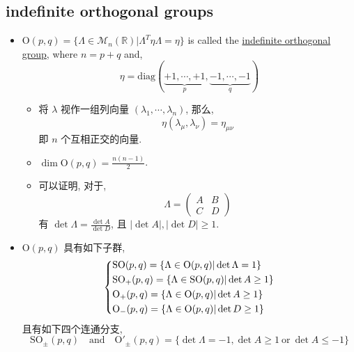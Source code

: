 \subsection{indefinite orthogonal groups}
\begin{itemize}
	\item $\mathrm{O}(p, q) = \{\Lambda \in \mathcal{M}_n(\mathbb{R}) | \Lambda^T \eta \Lambda = \eta\}$ is called the \href{https://en.wikipedia.org/wiki/Indefinite_orthogonal_group}{indefinite orthogonal group}, where $n = p + q$ and,
	\begin{equation}
		\eta = \mathrm{diag}(\underbrace{+ 1, \cdots, + 1}_{p}, \underbrace{- 1, \cdots, - 1}_{q})
	\end{equation}
	\begin{itemize}
		\item 将 $\lambda$ 视作一组列向量 $(\lambda_1, \cdots, \lambda_n)$, 那么,
		\begin{equation}
			\eta(\lambda_\mu, \lambda_\nu) = \eta_{\mu \nu}
		\end{equation}
		即 $n$ 个互相正交的向量.
		
		\item $\dim \mathrm{O}(p, q) = \frac{n (n - 1)}{2}$.
		
		\item 可以证明, 对于,
		\begin{equation}
			\Lambda = \begin{pmatrix}
				A & B \\
				C & D
			\end{pmatrix}
		\end{equation}
		有 $\det \Lambda = \frac{\det A}{\det D}$, 且 $|\det A|, |\det D| \geq 1$.
	\end{itemize}
	
	\item $\mathrm{O}(p, q)$ 具有如下子群,
	\begin{equation}
		\begin{dcases}
			\mathrm{SO}(p, q) = \{\Lambda \in \mathrm{O}(p, q) | \det \Lambda = 1\} \\
			\mathrm{SO}_+(p, q) = \{\Lambda \in \mathrm{SO}(p, q) | \det A \geq 1\} \\
			\mathrm{O}_+(p, q) = \{\Lambda \in \mathrm{O}(p, q) | \det A \geq 1\} \\
			\mathrm{O}_-(p, q) = \{\Lambda \in \mathrm{O}(p, q) | \det D \geq 1\}
		\end{dcases}
	\end{equation}
	且有如下四个连通分支,
	\begin{equation}
		\mathrm{SO}_\pm(p, q) \quad \text{and} \quad \mathrm{O'}_\pm(p, q) = \{\det \Lambda = - 1, \det A \geq 1 \ \text{or} \ \det A \leq - 1\}
	\end{equation}
\end{itemize}

